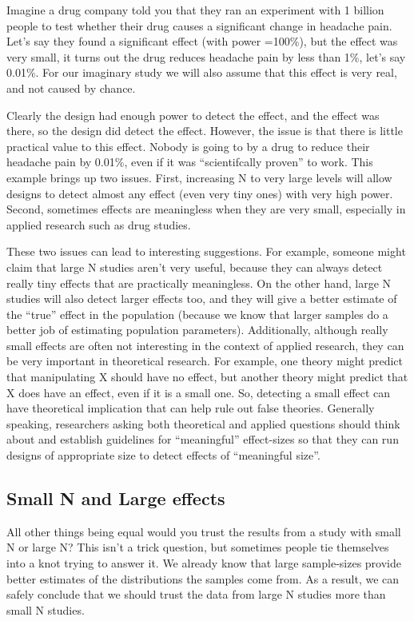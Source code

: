 \documentclass[]{book}
\begin{document}
Imagine a drug company told you that they ran an experiment with 1 billion people to test whether their drug causes a significant change in headache pain. Let's say they found a significant effect (with power =100\%), but the effect was very small, it turns out the drug reduces headache pain by less than 1\%, let's say 0.01\%. For our imaginary study we will also assume that this effect is very real, and not caused by chance.

Clearly the design had enough power to detect the effect, and the effect was there, so the design did detect the effect. However, the issue is that there is little practical value to this effect. Nobody is going to by a drug to reduce their headache pain by 0.01\%, even if it was ``scientifcally proven'' to work.
This example brings up two issues. First, increasing N to very large levels will allow designs to detect almost any effect (even very tiny ones) with very high power. Second, sometimes effects are meaningless when they are very small, especially in applied research such as drug studies.

These two issues can lead to interesting suggestions. For example, someone might claim that large N studies aren't very useful, because they can always detect really tiny effects that are practically meaningless. On the other hand, large N studies will also detect larger effects too, and they will give a better estimate of the ``true'' effect in the population (because we know that larger samples do a better job of estimating population parameters). Additionally, although really small effects are often not interesting in the context of applied research, they can be very important in theoretical research. For example, one theory might predict that manipulating X should have no effect, but another theory might predict that X does have an effect, even if it is a small one. So, detecting a small effect can have theoretical implication that can help rule out false theories. Generally speaking, researchers asking both theoretical and applied questions should think about and establish guidelines for ``meaningful'' effect-sizes so that they can run designs of appropriate size to detect effects of ``meaningful size''.

\hypertarget{small-n-and-large-effects}{%
\subsection{Small N and Large effects}\label{small-n-and-large-effects}}

All other things being equal would you trust the results from a study with small N or large N? This isn't a trick question, but sometimes people tie themselves into a knot trying to answer it. We already know that large sample-sizes provide better estimates of the distributions the samples come from. As a result, we can safely conclude that we should trust the data from large N studies more than small N studies.
\end{document}
